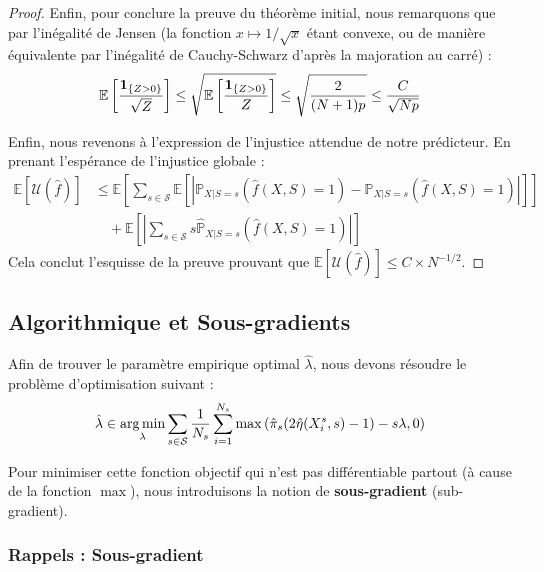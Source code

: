 \begin{proof}
    Enfin, pour conclure la preuve du théorème initial, nous remarquons que par l'inégalité de Jensen (la fonction $x \mapsto 1/\sqrt{x}$ étant convexe, ou de manière équivalente par l'inégalité de Cauchy-Schwarz d'après la majoration au carré) :
    \begin{equation*}
        \mathbb{E} \left[ \frac{\mathbf{1}_{\{Z > 0\}}}{\sqrt{Z}} \right] \le \sqrt{ \mathbb{E} \left[ \frac{\mathbf{1}_{\{Z > 0\}}}{Z} \right] } \le \sqrt{ \frac{2}{(N+1)p} } \le \frac{C}{\sqrt{Np}}
    \end{equation*}

    Enfin, nous revenons à l'expression de l'injustice attendue de notre prédicteur. En prenant l'espérance de l'injustice globale :
    \begin{align}
        \mathbb{E}[\mathcal{U}(\hat{f})] &\le \mathbb{E} \left[ \sum_{s \in \mathcal{S}} \mathbb{E} \left[ \left| \mathbb{P}_{X|S=s}(\hat{f}(X, S)=1) - \hat{\mathbb{P}}_{X|S=s}(\hat{f}(X, S)=1) \right| \right] \right] \nonumber \\
        &\quad + \mathbb{E} \left[ \left| \sum_{s \in \mathcal{S}} s \hat{\mathbb{P}}_{X|S=s}(\hat{f}(X, S)=1) \right| \right]
    \end{align}
    Cela conclut l'esquisse de la preuve prouvant que $\mathbb{E}[\mathcal{U}(\hat{f})] \le C \times N^{-1/2}$.
\end{proof}

\subsection{Algorithmique et Sous-gradients}

Afin de trouver le paramètre empirique optimal $\hat{\lambda}$, nous devons résoudre le problème d'optimisation suivant :
\begin{equation}
    \hat{\lambda} \in \operatorname*{arg\,min}_{\lambda} \sum_{s \in \mathcal{S}} \frac{1}{N_s} \sum_{i=1}^{N_s} \max \left( \hat{\pi}_s (2\hat{\eta}(X_i^s, s) - 1) - s\lambda, 0 \right)
\end{equation}

Pour minimiser cette fonction objectif qui n'est pas différentiable partout (à cause de la fonction $\max$), nous introduisons la notion de \textbf{sous-gradient} (sub-gradient).

\subsubsection{Rappels : Sous-gradient}

